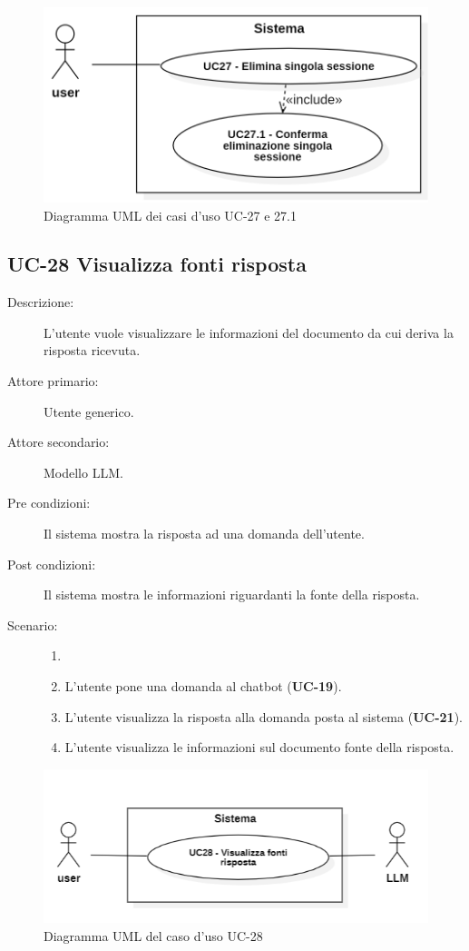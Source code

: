 \begin{figure}[H]
    \centering
    \includegraphics[width=0.8\linewidth]{UC27.PNG} 
    \caption{Diagramma UML dei casi d'uso UC-27 e 27.1}
    \label{fig:UC27}
\end{figure}

\subsection{UC-28 Visualizza fonti risposta}
\begin{description}
    \item[Descrizione:] L'utente vuole visualizzare le informazioni del documento da cui deriva la risposta ricevuta.
    \item[Attore primario:] Utente generico.
    \item[Attore secondario:] Modello LLM.
    \item[Pre condizioni:] Il sistema mostra la risposta ad una domanda dell'utente.
    \item[Post condizioni:] Il sistema mostra le informazioni riguardanti la fonte della risposta.
    \item[Scenario:]
    \begin{enumerate}
        \item[]
        \item L’utente pone una domanda al chatbot (\textbf{UC-19}).
        \item L'utente visualizza la risposta alla domanda posta al sistema (\textbf{UC-21}).
        \item L'utente visualizza le informazioni sul documento fonte della risposta.
    \end{enumerate}
\end{description}

\begin{figure}[H]
    \centering
    \includegraphics[width=0.9\linewidth]{UC28.PNG}
    \caption{Diagramma UML del caso d'uso UC-28}
    \label{fig:UC28}
\end{figure}

